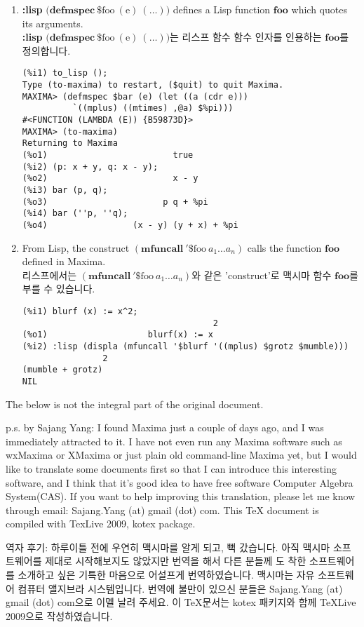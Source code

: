 \documentclass[12pt]{article}
\begin{document}
\begin{enumerate}
\item {\bf :lisp} $\mathrm{(}\mathbf{defmspec\ } \mathrm{\$foo\ (e)\ (\ldots))}$
defines a Lisp function $\mathbf{foo}$ which quotes its arguments. \\
{\bf :lisp} $\mathrm{(}\mathbf{defmspec\ } \mathrm{\$foo\ (e)\ (\ldots))}$는
리스프 함수 함수 인자를 인용하는 $\mathbf{foo}$를 정의합니다.
\begin{verbatim}
(%i1) to_lisp ();
Type (to-maxima) to restart, ($quit) to quit Maxima. 
MAXIMA> (defmspec $bar (e) (let ((a (cdr e)))
          `((mplus) ((mtimes) ,@a) $%pi)))
#<FUNCTION (LAMBDA (E)) {B59873D}>
MAXIMA> (to-maxima)
Returning to Maxima
(%o1)                         true
(%i2) (p: x + y, q: x - y);
(%o2)                         x - y
(%i3) bar (p, q);
(%o3)                       p q + %pi
(%i4) bar (''p, ''q);
(%o4)                 (x - y) (y + x) + %pi
\end{verbatim}
\item From Lisp, the construct $(\mathbf{mfuncall\ '\$}\mathrm{foo\ }a_1 \ldots a_n)$
calls the function $\mathbf{foo}$ defined in Maxima. \\
리스프에서는 $(\mathbf{mfuncall\ '\$}\mathrm{foo\ }a_1 \ldots a_n)$와 같은 'construct'로
맥시마 함수 $\mathbf{foo}$를 부를 수 있습니다.
\begin{verbatim}
(%i1) blurf (x) := x^2;
                                      2
(%o1)                    blurf(x) := x
(%i2) :lisp (displa (mfuncall '$blurf '((mplus) $grotz $mumble)))
                2
(mumble + grotz)
NIL
\end{verbatim}

\end{enumerate}
\newpage

The below is not the integral part of the original document.

p.s. by Sajang Yang: I found Maxima just a couple of days ago, and I was immediately
attracted to it. I have not even run any Maxima software such as wxMaxima or XMaxima or just
plain old command-line Maxima yet, but I would like to translate some documents first so that I can
introduce this interesting software, and I think that it's good idea to have free software Computer
Algebra System(CAS). If you want to help improving this translation, please let me know through
email: Sajang.Yang (at) gmail (dot) com. This TeX document is compiled with TexLive 2009,
kotex package.

역자 후기: 하루이틀 전에 우연히 맥시마를 알게 되고, 뻑 갔습니다. 아직 맥시마 소프트웨어를
제대로 시작해보지도 않았지만 번역을 해서 다른 분들께 도 착한 소프트웨어를 소개하고 싶은 
기특한 마음으로 어설프게 번역하였습니다. 맥시마는 자유 소프트웨어 컴퓨터 앨지브라 시스템입니다. 
번역에 불만이 있으신 분들은 Sajang.Yang (at) gmail (dot) com으로 이멜 날려 주세요. 
이 TeX문서는 kotex 패키지와 함께 TeXLive 2009으로 작성하였습니다.
\end{document}
